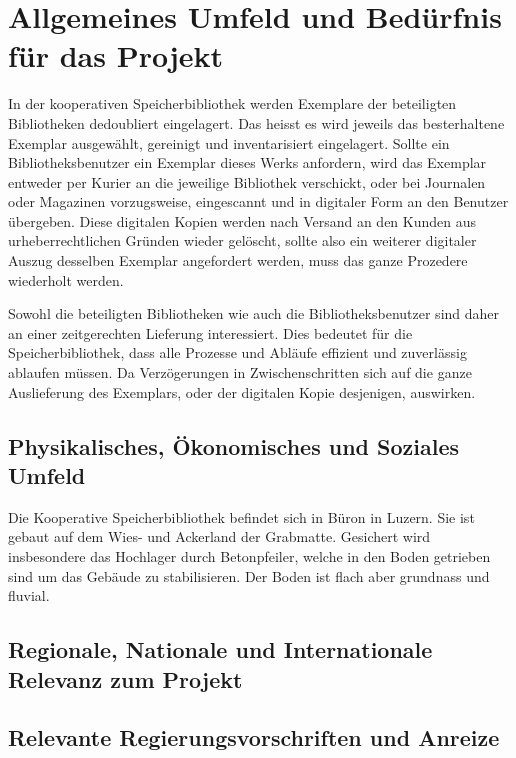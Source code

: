 \chapter{Allgemeines Umfeld und Bedürfnis für das Projekt}
In der kooperativen Speicherbibliothek werden Exemplare der beteiligten Bibliotheken dedoubliert eingelagert. Das heisst es wird jeweils das besterhaltene Exemplar ausgewählt, gereinigt und inventarisiert eingelagert. Sollte ein Bibliotheksbenutzer ein Exemplar dieses Werks anfordern, wird das Exemplar entweder per Kurier an die jeweilige Bibliothek verschickt, oder bei Journalen oder Magazinen vorzugsweise, eingescannt und in digitaler Form an den Benutzer übergeben. Diese digitalen Kopien werden nach Versand an den Kunden aus urheberrechtlichen Gründen wieder gelöscht, sollte also ein weiterer digitaler Auszug desselben Exemplar angefordert werden, muss das ganze Prozedere wiederholt werden.

Sowohl die beteiligten Bibliotheken wie auch die Bibliotheksbenutzer sind daher an einer zeitgerechten Lieferung interessiert. Dies bedeutet für die Speicherbibliothek, dass alle Prozesse und Abläufe effizient und zuverlässig ablaufen müssen. Da Verzögerungen in Zwischenschritten sich auf die ganze Auslieferung des Exemplars, oder der digitalen Kopie desjenigen, auswirken.

\section{Physikalisches, Ökonomisches und Soziales Umfeld}
Die Kooperative Speicherbibliothek befindet sich in Büron in Luzern. Sie ist gebaut auf dem Wies- und Ackerland der Grabmatte. Gesichert wird insbesondere das Hochlager durch Betonpfeiler, welche in den Boden getrieben sind um das Gebäude zu stabilisieren. Der Boden ist flach aber grundnass und fluvial. \parencite{GeoMapAdmin2019}


\section{Regionale, Nationale und Internationale Relevanz zum Projekt}

\section{Relevante Regierungsvorschriften und Anreize}

